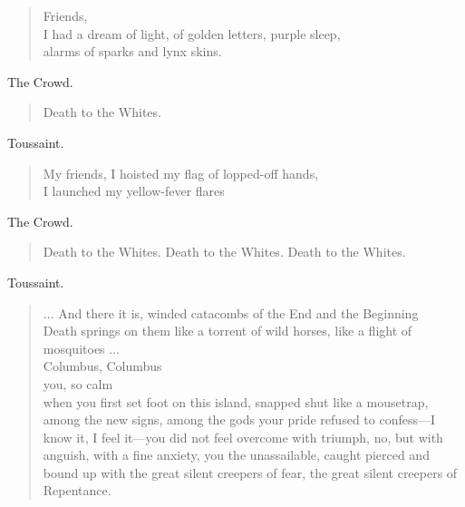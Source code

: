 \documentclass[letterpaper,article,12pt,oneside,notitlepage]{memoir}
\begin{document}
\begin{verse}
\hspace{1cm} Friends, \\
I had a dream of light, of golden letters, purple sleep, \\
alarms of sparks and lynx skins. \\
\end{verse}

\begin{center}The Crowd.\end{center}

\begin{verse}
\hspace{1cm} Death to the Whites. \\
\end{verse}

\begin{center}Toussaint.\end{center}

\begin{verse}
\hspace{1cm} My friends, I hoisted my flag of lopped-off hands, \\
I launched my yellow-fever flares \\
\end{verse}

\begin{center}The Crowd.\end{center}

\begin{verse}
\hspace{1cm} Death to the Whites. Death to the Whites. Death to the Whites. \\
\end{verse}

\begin{center}Toussaint.\end{center}

\begin{verse}
\hspace{1cm} ... And there it is, winded catacombs of the End and the Beginning \\
Death springs on them like a torrent of wild horses, like a flight of mosquitoes ... \\
Columbus, Columbus \\
you, so calm \\
when you first set foot on this island, snapped shut like a mousetrap, \\
among the new signs, among the gods your pride refused to confess---I know it, I feel it---you did not feel overcome with triumph, no, but with anguish, with a fine anxiety, you the unassailable, caught pierced and bound up with the great silent creepers of fear, the great silent creepers of Repentance. \\
\end{verse}
\end{document}
